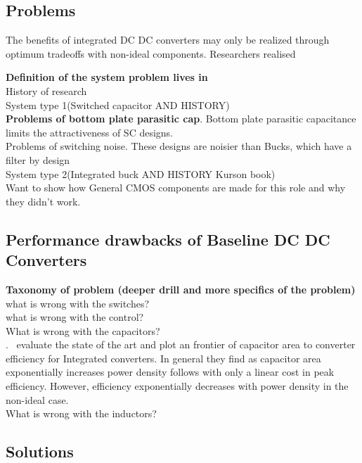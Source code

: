 \documentclass[letterpaper,twocolumn,10pt]{article}
\begin{document}
\subsection{Problems}
The benefits of integrated DC DC converters may only be realized through optimum tradeoffs with non-ideal components. Researchers realised  

\textbf{Definition of the system problem lives in}\\
History of research\\
System type 1(Switched capacitor AND HISTORY)\\
\textbf{Problems of bottom plate parasitic cap}. Bottom plate parasitic capacitance limits the attractiveness of SC designs. \\
Problems of switching noise. These designs are noisier than Bucks, which have a filter by design\\

System type 2(Integrated buck AND HISTORY Kurson book)\\
Want to show how General CMOS components are made for this role and why they didn't work.\\

\subsection{Performance drawbacks of Baseline DC DC Converters}

\textbf{Taxonomy of problem (deeper drill and more specifics of the problem)}\\
what is wrong with the switches?\\
what is wrong with the control? \\
What is wrong with the capacitors?\\
.~\cite{Pique2012} evaluate the state of the art and plot an frontier of capacitor area to converter efficiency for Integrated converters. In general they find as capacitor area exponentially increases power density follows with only a linear cost in peak efficiency. However, efficiency exponentially decreases with power density in the non-ideal case. \\
What is wrong with the inductors?\\

\subsection{Solutions}
\end{document}
